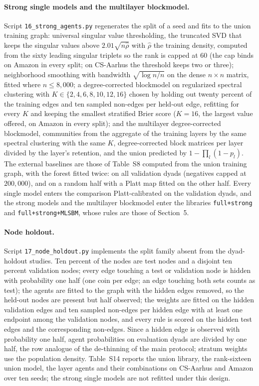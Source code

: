 \documentclass[12pt]{article}
\begin{document}
\paragraph{Strong single models and the multilayer blockmodel.}
Script \texttt{16\_strong\_agents.py} regenerates the split of a seed and fits to the union training graph: universal singular value thresholding, the truncated SVD that keeps the singular values above $2.01\sqrt{n\hat\rho}$ with $\hat\rho$ the training density, computed from the sixty leading singular triplets so the rank is capped at $60$ (the cap binds on Amazon in every split; on CS-Aarhus the threshold keeps two or three); neighborhood smoothing with bandwidth $\sqrt{\log n/n}$ on the dense $n\times n$ matrix, fitted where $n\le8{,}000$; a degree-corrected blockmodel on regularized spectral clustering with $K\in\{2,4,6,8,10,12,16\}$ chosen by holding out twenty percent of the training edges and ten sampled non-edges per held-out edge, refitting for every $K$ and keeping the smallest stratified Brier score ($K=16$, the largest value offered, on Amazon in every split); and the multilayer degree-corrected blockmodel, communities from the aggregate of the training layers by the same spectral clustering with the same $K$, degree-corrected block matrices per layer divided by the layer's retention, and the union predicted by $1-\prod_l(1-p_l)$. The external baselines are those of Table~S8 computed from the union training graph, with the forest fitted twice: on all validation dyads (negatives capped at $200{,}000$), and on a random half with a Platt map fitted on the other half. Every single model enters the comparison Platt-calibrated on the validation dyads, and the strong models and the multilayer blockmodel enter the libraries \texttt{full+strong} and \texttt{full+strong+MLSBM}, whose rules are those of Section~5.

\paragraph{Node holdout.}
Script \texttt{17\_node\_holdout.py} implements the split family absent from the dyad-holdout studies. Ten percent of the nodes are test nodes and a disjoint ten percent validation nodes; every edge touching a test or validation node is hidden with probability one half (one coin per edge; an edge touching both sets counts as test); the agents are fitted to the graph with the hidden edges removed, so the held-out nodes are present but half observed; the weights are fitted on the hidden validation edges and ten sampled non-edges per hidden edge with at least one endpoint among the validation nodes, and every rule is scored on the hidden test edges and the corresponding non-edges. Since a hidden edge is observed with probability one half, agent probabilities on evaluation dyads are divided by one half, the row analogue of the de-thinning of the main protocol; stratum weights use the population density. Table~S14 reports the union library, the rank-sixteen union model, the layer agents and their combinations on CS-Aarhus and Amazon over ten seeds; the strong single models are not refitted under this design.
\end{document}
